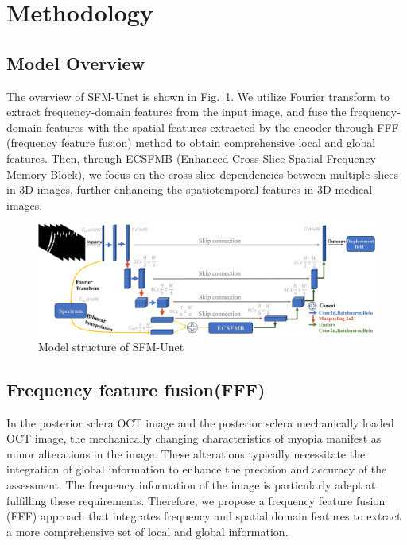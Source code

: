 \documentclass[AMA,Times1COL]{WileyNJDv5} %
\providecommand{\DIFadd}[1]{{\protect\color{blue}\uwave{#1}}} %
\providecommand{\DIFdel}[1]{{\protect\color{red}\sout{#1}}}                      %
\providecommand{\DIFaddbegin}{} %
\providecommand{\DIFaddend}{} %
\providecommand{\DIFdelbegin}{} %
\providecommand{\DIFdelend}{} %
\begin{document}
\section{Methodology}
\subsection{Model Overview}
The overview of SFM-Unet is shown in Fig.~\ref{fig:1}. We utilize Fourier transform to extract frequency-domain features from the input image, and fuse the frequency-domain features with the spatial features extracted by the encoder through FFF (frequency feature fusion) method to obtain comprehensive local and global features. Then, through ECSFMB (Enhanced Cross-Slice Spatial-Frequency Memory Block), we focus on the cross slice dependencies between multiple slices in 3D images, further enhancing the spatiotemporal features in 3D medical images.

\begin{figure}[htbp]
\centerline{\includegraphics[width=0.95\linewidth]{Fig/fig1.png}}
\caption{Model structure of SFM-Unet}
\label{fig:1}
\end{figure}

\subsection{Frequency feature fusion(FFF)}
In the posterior sclera OCT image and the posterior sclera mechanically loaded OCT image, the mechanically changing characteristics of myopia manifest as minor alterations in the image. These alterations typically necessitate the integration of global information to enhance the precision and accuracy of the assessment. The frequency information of the image is \DIFdelbegin \DIFdel{particularly adept at fulfilling these requirements}\DIFdelend \DIFaddbegin \DIFadd{well suited for this purpose}\DIFaddend . Therefore, we propose a frequency feature fusion (FFF) approach that integrates frequency and spatial domain features to extract a more comprehensive set of local and global information.
\end{document}
